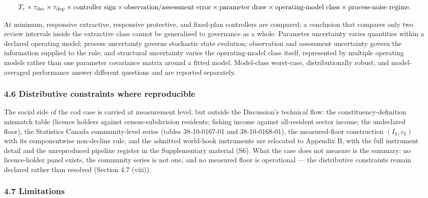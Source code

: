 \documentclass[11pt]{article}
\begin{document}
\[
T_r\times\tau_{\rm dec}\times\tau_{\rm dep}\times\text{controller sign}\times\text{observation/assessment error}\times\text{parameter draw}\times\text{operating-model class}\times\text{process-noise regime}.
\]

At minimum, responsive extractive, responsive protective, and fixed-plan
controllers are compared; a conclusion that compares only two review
intervals inside the extractive class cannot be generalised to
governance as a whole. Parameter uncertainty varies quantities within a
declared operating model; process uncertainty governs stochastic state
evolution; observation and assessment uncertainty govern the information
supplied to the rule; and structural uncertainty varies the
operating-model class itself, represented by multiple operating models
rather than one parameter covariance matrix around a fitted model.
Model-class worst-case, distributionally robust, and model-averaged
performance answer different questions and are reported separately.

\subsubsection{4.6 Distributive constraints where
reproducible}\label{distributive-constraints-where-reproducible}

The social side of the cod case is carried at measurement level, but
outside the Discussion's technical flow: the constituency-definition
mismatch table (licence holders against census-subdivision residents;
fishing income against all-resident sector income; the undeclared
floor), the Statistics Canada community-level series (tables
38-10-0167-01 and 38-10-0168-01), the measured-floor construction
\((I_k, c_k)\) with its componentwise non-decline rule, and the admitted
world-hook instruments are relocated to Appendix B, with the full
instrument detail and the unreproduced pipeline register in the
Supplementary material (S6). What the case does not measure is the
summary: no licence-holder panel exists, the community series is not
one, and no measured floor is operational --- the distributive
constraints remain declared rather than resolved (Section 4.7 (viii)).

\subsubsection{4.7 Limitations}\label{limitations}
\end{document}
